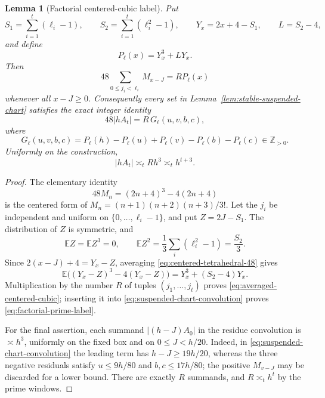 \documentclass[11pt,reqno]{amsart}
\newtheorem{lemma}[theorem]{Lemma}
\theoremstyle{definition}
\theoremstyle{remark}
\begin{document}
\begin{lemma}[Factorial centered-cubic label]
\label{lem:centered-cubic-label}
Put
\begin{equation}\label{eq:S1S2YL-definitions}
 S_1=\sum_{i=1}^t(\ell_i-1),\qquad
 S_2=\sum_{i=1}^t(\ell_i^2-1),\qquad
 Y_x=2x+4-S_1,\qquad L=S_2-4,
\end{equation}
and define
\begin{equation}\label{eq:moving-cubic-polynomial}
 P_{\boldsymbol\ell}(x)=Y_x^3+LY_x.
\end{equation}
Then
\begin{equation}\label{eq:averaged-centered-cubic}
 48\sum_{0\leq j_i<\ell_i}M_{x-J}
 =R P_{\boldsymbol\ell}(x)
\end{equation}
whenever all $x-J\geq0$.  Consequently every set in
Lemma~\ref{lem:stable-suspended-chart} satisfies the exact integer identity
\begin{equation}\label{eq:factorial-prime-label}
 48|hA_t|=R\,G_{\boldsymbol\ell}(u,v,b,c),
\end{equation}
where
\begin{equation}\label{eq:G-prime-label}
 G_{\boldsymbol\ell}(u,v,b,c)=
 P_{\boldsymbol\ell}(h)-P_{\boldsymbol\ell}(u)
 +P_{\boldsymbol\ell}(v)-P_{\boldsymbol\ell}(b)
 -P_{\boldsymbol\ell}(c)\in\mathbb Z_{>0}.
\end{equation}
Uniformly on the construction,
\begin{equation}\label{eq:endpoint-macroscopic-window}
 |hA_t|\asymp_t Rh^3\asymp_t h^{t+3}.
\end{equation}
\end{lemma}

\begin{proof}
The elementary identity
\begin{equation}\label{eq:centered-tetrahedral-48}
 48M_n=(2n+4)^3-4(2n+4)
\end{equation}
is the centered form of $M_n=(n+1)(n+2)(n+3)/3!$.  Let the $j_i$ be
independent and uniform on $\{0,\ldots,\ell_i-1\}$, and put
$Z=2J-S_1$.  The distribution of $Z$ is symmetric, and
\[
 \mathbb EZ=\mathbb EZ^3=0,\qquad
 \mathbb EZ^2=\frac13\sum_i(\ell_i^2-1)=\frac{S_2}{3}.
\]
Since $2(x-J)+4=Y_x-Z$, averaging
\eqref{eq:centered-tetrahedral-48} gives
\[
 \mathbb E\bigl((Y_x-Z)^3-4(Y_x-Z)\bigr)
 =Y_x^3+(S_2-4)Y_x.
\]
Multiplication by the number $R$ of tuples $(j_1,\ldots,j_t)$ proves
\eqref{eq:averaged-centered-cubic}; inserting it into
\eqref{eq:suspended-chart-convolution} proves
\eqref{eq:factorial-prime-label}.

For the final assertion, each summand $|(h-J)A_0|$ in the residue
convolution is $\asymp h^3$, uniformly on the fixed box and on
$0\leq J<h/20$.  Indeed, in
\eqref{eq:suspended-chart-convolution} the leading term has
$h-J\geq19h/20$, whereas the three negative residuals satisfy
$u\leq9h/80$ and $b,c\leq17h/80$; the positive $M_{v-J}$ may be discarded
for a lower bound.  There are exactly $R$ summands, and
$R\asymp_t h^t$ by the prime windows.
\end{proof}
\end{document}
